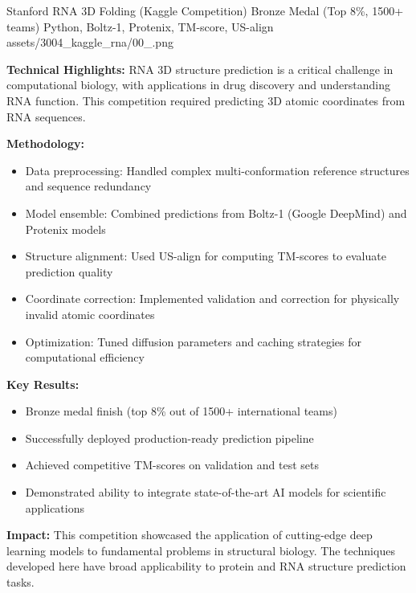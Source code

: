 \ProjectEntry
{Stanford RNA 3D Folding (Kaggle Competition)}
{Bronze Medal (Top 8\%, 1500+ teams)}
{Python, Boltz-1, Protenix, TM-score, US-align}
{
}
{assets/3004_kaggle_rna/00_.png}
{ }
{  }

\textbf{Technical Highlights:}
RNA 3D structure prediction is a critical challenge in computational biology, with applications in drug discovery and understanding RNA function. This competition required predicting 3D atomic coordinates from RNA sequences.

\textbf{Methodology:}
\begin{itemize}[leftmargin=1.2em, itemsep=0.1em]
  \item Data preprocessing: Handled complex multi-conformation reference structures and sequence redundancy
  \item Model ensemble: Combined predictions from Boltz-1 (Google DeepMind) and Protenix models
  \item Structure alignment: Used US-align for computing TM-scores to evaluate prediction quality
  \item Coordinate correction: Implemented validation and correction for physically invalid atomic coordinates
  \item Optimization: Tuned diffusion parameters and caching strategies for computational efficiency
\end{itemize}

\textbf{Key Results:}
\begin{itemize}[leftmargin=1.2em, itemsep=0.1em]
  \item Bronze medal finish (top 8\% out of 1500+ international teams)
  \item Successfully deployed production-ready prediction pipeline
  \item Achieved competitive TM-scores on validation and test sets
  \item Demonstrated ability to integrate state-of-the-art AI models for scientific applications
\end{itemize}

\textbf{Impact:} 
This competition showcased the application of cutting-edge deep learning models to fundamental problems in structural biology. The techniques developed here have broad applicability to protein and RNA structure prediction tasks.


